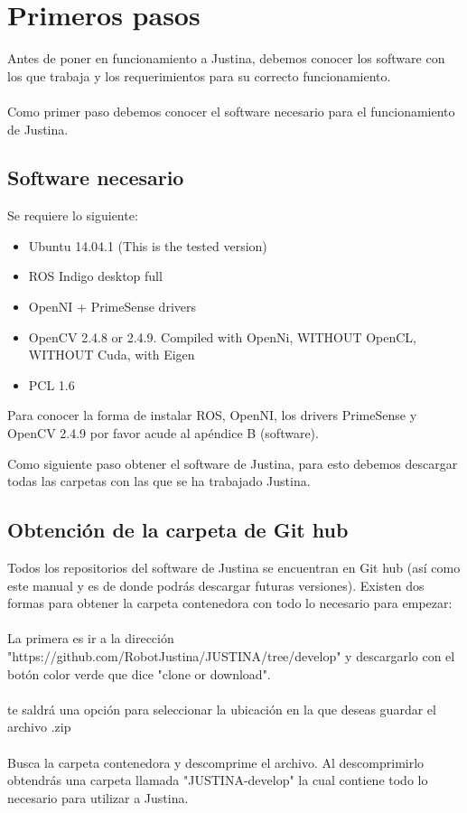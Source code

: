 \documentclass[user_manual.tex]{subfiles}
\begin{document}
 \chapter{Primeros pasos}
 Antes de poner en funcionamiento a Justina, debemos conocer los software con los que trabaja y los requerimientos para 
 su correcto funcionamiento.\\
 \\
 Como primer paso debemos conocer el software necesario para el funcionamiento de Justina. 
 
 \section{Software necesario}

Se requiere lo siguiente:
\begin{itemize}
\item Ubuntu 14.04.1 (This is the tested version)
\item ROS Indigo desktop full
\item OpenNI + PrimeSense drivers
\item OpenCV 2.4.8 or 2.4.9. Compiled with OpenNi, WITHOUT OpenCL, WITHOUT Cuda, with Eigen
\item PCL 1.6
\end{itemize}

Para conocer la forma de instalar ROS, OpenNI, los drivers PrimeSense y OpenCV 2.4.9 por favor acude al apéndice B (software).

 \newpage
 Como siguiente paso obtener el software de Justina, para esto debemos descargar todas las carpetas con las que se ha 
 trabajado Justina.
 \section{Obtención de la carpeta de Git hub}
 Todos los repositorios del software de Justina se encuentran en Git hub (así como este manual y es de donde podrás descargar
 futuras versiones). Existen dos formas para obtener la carpeta contenedora con todo lo necesario para empezar:\\
 \\
 La primera es ir a la dirección "https://github.com/RobotJustina/JUSTINA/tree/develop" y descargarlo con el botón color verde
 que dice "clone or download".\\
 \\
 te saldrá una opción para seleccionar la ubicación en la que deseas guardar el archivo .zip\\
 \\
 Busca la carpeta contenedora y descomprime el archivo. Al descomprimirlo obtendrás una carpeta llamada "JUSTINA-develop" la 
 cual contiene todo lo necesario para utilizar a Justina.
 
\end{document}
